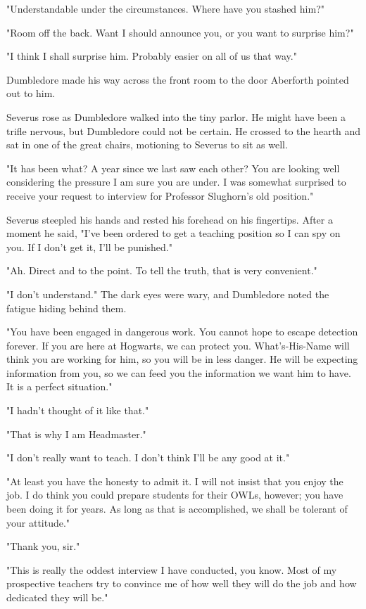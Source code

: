 "Understandable under the circumstances. Where have you stashed him?"

"Room off the back. Want I should announce you, or you want to surprise him?"

"I think I shall surprise him. Probably easier on all of us that way."

Dumbledore made his way across the front room to the door Aberforth pointed out to him.

Severus rose as Dumbledore walked into the tiny parlor. He might have been a trifle nervous, but Dumbledore could not be certain. He crossed to the hearth and sat in one of the great chairs, motioning to Severus to sit as well.

"It has been what? A year since we last saw each other? You are looking well considering the pressure I am sure you are under. I was somewhat surprised to receive your request to interview for Professor Slughorn's old position."

Severus steepled his hands and rested his forehead on his fingertips. After a moment he said, "I've been ordered to get a teaching position so I can spy on you. If I don't get it, I'll be punished."

"Ah. Direct and to the point. To tell the truth, that is very convenient."

"I don't understand." The dark eyes were wary, and Dumbledore noted the fatigue hiding behind them.

"You have been engaged in dangerous work. You cannot hope to escape detection forever. If you are here at Hogwarts, we can protect you. What's-His-Name will think you are working for him, so you will be in less danger. He will be expecting information from you, so we can feed you the information we want him to have. It is a perfect situation."

"I hadn't thought of it like that."

"That is why I am Headmaster."

"I don't really want to teach. I don't think I'll be any good at it."

"At least you have the honesty to admit it. I will not insist that you enjoy the job. I do think you could prepare students for their OWLs, however; you have been doing it for years. As long as that is accomplished, we shall be tolerant of your attitude."

"Thank you, sir."

"This is really the oddest interview I have conducted, you know. Most of my prospective teachers try to convince me of how well they will do the job and how dedicated they will be."

